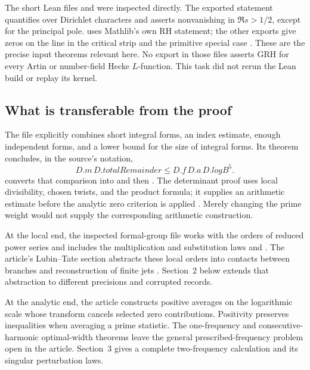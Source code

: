 \documentclass[11pt]{article}
\theoremstyle{definition}\newtheorem{definition}[theorem]{Definition}
\theoremstyle{remark}\newtheorem{remark}[theorem]{Remark}
\begin{document}
The short Lean files  and 
were inspected directly. The exported statement
 quantifies over Dirichlet characters
and asserts nonvanishing in $\Re s>1/2$, except for the principal pole.
 uses Mathlib's own RH statement; the other exports
give zeros on the line in the critical strip and the primitive special case
\cite{LeanExports}. These are the precise input theorems relevant here.
No export in those files asserts GRH for every Artin or number-field Hecke
$L$-function. This task did not rerun the Lean build or replay its kernel.

\subsection{What is transferable from the proof}

The file  explicitly combines
short integral forms, an index estimate, enough independent forms, and a
lower bound for the size of integral forms. Its theorem
 concludes, in the source's notation,
\[
 D.m\,D.totalRemainder\le D.f\,D.a\,D.logB^5.
\]
 converts that comparison into
 and then .
The determinant proof uses local divisibility, chosen twists, and the product
formula; it supplies an arithmetic estimate before the analytic zero criterion
is applied \cite{LeanMechanism}. Merely changing the prime weight would not
supply the corresponding arithmetic construction.

At the local end, the inspected formal-group file
 works with the orders of
reduced power series and includes the multiplication and substitution laws
 and . The article's
Lubin--Tate section abstracts these local orders into contacts between branches
and reconstruction of finite jets \cite{LeanLocal,Source}. Section~2 below
extends that abstraction to different precisions and corrupted records.

At the analytic end, the article constructs positive averages on the
logarithmic scale whose transform cancels selected zero contributions.
Positivity preserves inequalities when averaging a prime statistic.
The one-frequency and consecutive-harmonic optimal-width theorems leave the
general prescribed-frequency problem open in the article. Section~3 gives
a complete two-frequency calculation and its singular perturbation laws.
\end{document}

